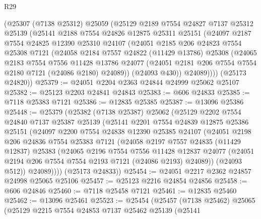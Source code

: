 \begin{lexlean}{R29}
\begin{coremodule}
    (@25307
      (@7138 @25312)
      @25059
      (@25129
        @2189
        @7554
        @24827
        @7137
        @25312
        @25139
        (@25141
          @2188
          @7554
          @24826
          @12875
          @25311
          @25151
          (@24097
            @2187
            @7554
            @24825
            @12390
            @25310
            @24107
            (@24051
              @2185
              @206
              @24823
              @7554
              @25308
              @7121
              (@24058
                @2184
                @7557
                @24822
                (@11429 @13786)
                @25308
                (@24065
                  @2183
                  @7554
                  @7556
                  @11428
                  @13786
                  @24077
                  (@24051 @2181 @206 @7554 @7554 @2180 @7121 (@24086 @2180) @24089))
                (@24093 @430))
              @24089))))
      (@25173 @24820))
@25379 := @24051 @2204 @2363 @24844 @24999 @25062 @25107
@25382 := @25123 @2203 @24841 @24843
@25383 := @606 @24833
@25385 := @7118 @25383 @7121
@25386 := @12835 @25385
@25387 := @13096 @25386
@25448 := @25379
    (@25382
      (@7138 @25387)
      @25062
      (@25129
        @2202
        @7554
        @24840
        @7137
        @25387
        @25139
        (@25141
          @2201
          @7554
          @24839
          @12875
          @25386
          @25151
          (@24097
            @2200
            @7554
            @24838
            @12390
            @25385
            @24107
            (@24051
              @2198
              @206
              @24836
              @7554
              @25383
              @7121
              (@24058
                @2197
                @7557
                @24835
                (@11429 @12837)
                @25383
                (@24065
                  @2196
                  @7554
                  @7556
                  @11428
                  @12837
                  @24077
                  (@24051 @2194 @206 @7554 @7554 @2193 @7121 (@24086 @2193) @24089))
                (@24093 @512))
              @24089))))
      (@25173 @24833))
@25454 := @24051 @2217 @2362 @24857 @24998 @25065 @25106
@25457 := @25123 @2216 @24854 @24856
@25458 := @606 @24846
@25460 := @7118 @25458 @7121
@25461 := @12835 @25460
@25462 := @13096 @25461
@25523 := @25454
    (@25457
      (@7138 @25462)
      @25065
      (@25129
        @2215
        @7554
        @24853
        @7137
        @25462
        @25139
        (@25141

\end{coremodule}
\end{lexlean}
